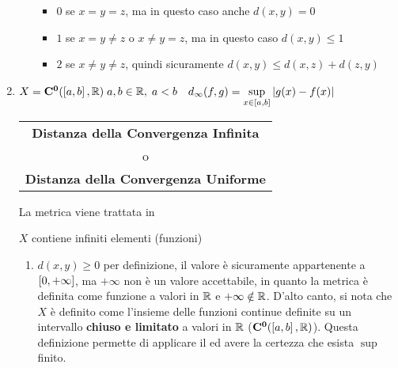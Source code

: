 \begin{example}
\begin{enumerate}
\begin{enumerate}[label=\arabic*.]
					\begin{itemize}
						\item $0$ se $x = y = z$, ma in questo caso anche $d(x,y) = 0$
						\item $1$ se $x = y \neq z$ o $x \neq y = z$, ma in questo caso $d(x,y) \leq 1$
						\item $2$ se $x \neq y \neq z$, quindi sicuramente $d(x,y) \leq d(x,z) + d(z,y)$
					\end{itemize}
			\end{enumerate}
		\item $X=\mathbf{C^{0}}(\left[a,b\right],\mathbb{R})\;a,b\in\mathbb{R},\;a<b \quad d_\infty(f,g) = \sup\limits_{x\in\left[a,b\right]}\left|g(x)-f(x)\right|$ \hfill
			{\footnotesize
				\begin{tabular}{c}
					\textbf{Distanza della Convergenza Infinita}\\
					o\\
					\textbf{Distanza della Convergenza Uniforme}
				\end{tabular}
			}\label{ex:dim_dist_conv_unif}
			\begin{note}
				La metrica viene trattata in 
			\end{note}
			\begin{note}
				$X$ contiene infiniti elementi (funzioni)
			\end{note}
			\begin{center}
			\end{center}
			\begin{enumerate}[label=\arabic*.]
				\item $d(x,y) \geq 0$ per definizione, il valore è sicuramente appartenente a $\left[0,+\infty\right]$, ma $+\infty$ non è un valore accettabile, in quanto la metrica è definita come funzione a valori in $\mathbb{R}$ e $+\infty \notin \mathbb{R}$. D'alto canto, si nota che $X$ è definito come l'insieme delle funzioni continue definite su un intervallo \textbf{chiuso e limitato} a valori in $\mathbb{R}$ ($\mathbf{C^{0}}(\left[a,b\right],\mathbb{R})$). Questa definizione permette di applicare il  ed avere la certezza che esista $\sup$ finito.

\end{enumerate}
\end{enumerate}
\end{example}
